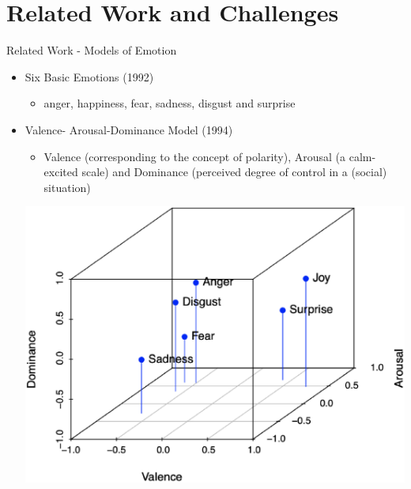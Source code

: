 \documentclass[
 size=14pt,
 paper=smartboard,  %
 mode=present, 		%
 display=slides, 	%
 style=tuliplab,  	%
 pauseslide,
 fleqn,leqno]{powerdot}
\begin{document}
\section{Related Work and Challenges}



\begin{slide}{Related Work - Models of Emotion}
	
	
	\begin{itemize}
		\item
		Six Basic Emotions (1992)
		
		\begin{itemize}
			\item
			anger, happiness, fear, sadness, disgust and surprise
		\end{itemize}
		
		\item 
		Valence- Arousal-Dominance Model (1994)
		
		\begin{itemize}
			\item 
			Valence (corresponding to the concept of polarity),
			Arousal (a calm-excited scale) and
			Dominance (perceived degree of control in a (social) situation)
		\end{itemize}
		\begin{center}
			\includegraphics[width=.4\linewidth]{figures/six_emotions_vad.eps}
		\end{center}
	\end{itemize}
	
	
\end{slide}
\end{document}
